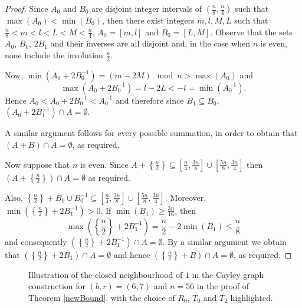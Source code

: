 \documentclass[a4paper,12pt]{article}
\begin{document}
\begin{proof}
	Since $A_0$ and $B_0$ are disjoint integer intervals of $\left(\frac{n}{8}, \frac{n}{4}\right)$ such that $\max(A_0) < \min(B_0)$, then there exist integers $m, l, M, L$ such that $\frac{n}{8} < m < l < L < M < \frac{n}{4}$, $A_0 = \left[m, l\right]$ and $B_0 = \left[L, M\right]$. Observe that the sets $A_0$, $B_0$, $2B_1$ and their inverses are all disjoint and, in the case when $n$ is even, none include the involution $\frac{n}{2}$. 
	
	Now, $\min\left(A_0 + 2B_0^{-1}\right) = (m - 2M) \mod n > \max(A_0)$ and $$\max\left(A_0 + 2B_0^{-1}\right) = l - 2L < -l = \min\left(A_0^{-1}\right).$$ Hence $A_0 < A_0 + 2B_0^{-1} < A_0^{-1}$ and therefore since $B_1 \subseteq B_0$, $\left(A_0 + 2B_1^{-1}\right) \cap A = \emptyset$. 
	
	A similar argument follows for every possible summation, in order to obtain that $(A + B) \cap A = \emptyset$, as required.
	
	Now suppose that $n$ is even. Since $A + \left\{\frac{n}{2}\right\} \subseteq \left[\frac{n}{4}, \frac{3n}{8}\right] \cup \left[\frac{5n}{8}, \frac{3n}{4}\right]$ then $\left(A + \left\{\frac{n}{2}\right\}\right) \cap A = \emptyset$ as required.
	
	Also, $\left\{\frac{n}{2}\right\} + B_0 \cup B_0^{-1} \subseteq \left[\frac{n}{4}, \frac{3n}{8}\right] \cup \left[\frac{5n}{8}, \frac{3n}{4}\right]$. Moreover, $\min\left(\left\{\frac{n}{2}\right\} + 2B_1^{-1}\right) > 0$. If $\min(B_1) \geq \frac{3n}{16}$, then $$\max\left(\left\{\frac{n}{2}\right\} + 2B_1^{-1}\right) = \frac{n}{2} - 2\min(B_1) \leq \frac{n}{8}$$ and consequently $\left(\left\{\frac{n}{2}\right\} + 2B_1^{-1}\right) \cap A = \emptyset$. By a similar argument we obtain that $\left(\left\{\frac{n}{2}\right\} + 2B_1\right) \cap A = \emptyset$ and hence $\left(\left\{\frac{n}{2}\right\} + B\right) \cap A = \emptyset$, as required.
\end{proof}

\begin{figure}[t!]
\centering
{}
\caption{Illustration of the closed neighbourhood of $1$ in the Cayley graph construction for $(b, r) = (6, 7)$ and $n = 56$ in the proof of Theorem \ref{newBound}, with the choice of $R_0$, $T_0$ and $T_2$ highlighted.}
\label{cayley_union_counting_fig}
\end{figure}
\end{document}
